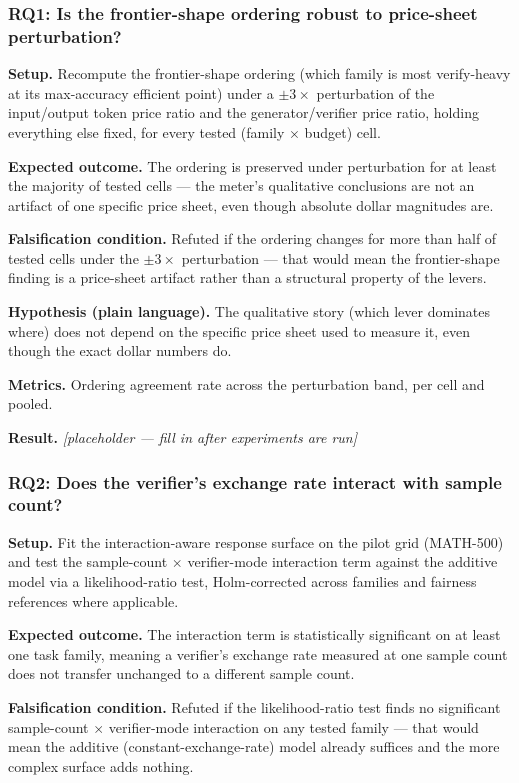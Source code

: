 \documentclass[11pt]{article}
\newcommand{\ph}{\textit{[placeholder --- fill in after experiments are run]}}
\begin{document}
\subsubsection{RQ1: Is the frontier-shape ordering robust to price-sheet perturbation?}
\textbf{Setup.} Recompute the frontier-shape ordering (which family is most verify-heavy at its max-accuracy efficient point) under a $\pm 3\times$ perturbation of the input/output token price ratio and the generator/verifier price ratio, holding everything else fixed, for every tested (family $\times$ budget) cell.

\textbf{Expected outcome.} The ordering is preserved under perturbation for at least the majority of tested cells --- the meter's qualitative conclusions are not an artifact of one specific price sheet, even though absolute dollar magnitudes are.

\textbf{Falsification condition.} Refuted if the ordering changes for more than half of tested cells under the $\pm 3\times$ perturbation --- that would mean the frontier-shape finding is a price-sheet artifact rather than a structural property of the levers.

\textbf{Hypothesis (plain language).} The qualitative story (which lever dominates where) does not depend on the specific price sheet used to measure it, even though the exact dollar numbers do.

\textbf{Metrics.} Ordering agreement rate across the perturbation band, per cell and pooled.

\textbf{Result.} \ph

\subsubsection{RQ2: Does the verifier's exchange rate interact with sample count?}
\textbf{Setup.} Fit the interaction-aware response surface on the pilot grid (MATH-500) and test the sample-count $\times$ verifier-mode interaction term against the additive model via a likelihood-ratio test, Holm-corrected across families and fairness references where applicable.

\textbf{Expected outcome.} The interaction term is statistically significant on at least one task family, meaning a verifier's exchange rate measured at one sample count does not transfer unchanged to a different sample count.

\textbf{Falsification condition.} Refuted if the likelihood-ratio test finds no significant sample-count $\times$ verifier-mode interaction on any tested family --- that would mean the additive (constant-exchange-rate) model already suffices and the more complex surface adds nothing.
\end{document}
